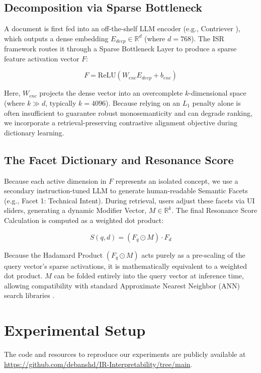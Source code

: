 \documentclass[sigconf,authordraft]{acmart}
\begin{document}
\subsection{Decomposition via Sparse Bottleneck}
A document is first fed into an off-the-shelf LLM encoder (e.g., Contriever \cite{izacard2022}), which outputs a dense embedding $E_{deep} \in \mathbb{R}^d$ (where $d=768$). The ISR framework routes it through a Sparse Bottleneck Layer to produce a sparse feature activation vector $F$:

\begin{equation}
F = \text{ReLU}(W_{enc}E_{deep} + b_{enc})
\end{equation}

Here, $W_{enc}$ projects the dense vector into an overcomplete $k$-dimensional space (where $k \gg d$, typically $k=4096$). Because relying on an $L_1$ penalty alone is often insufficient to guarantee robust monosemanticity and can degrade ranking, we incorporate a retrieval-preserving contrastive alignment objective during dictionary learning.

\subsection{The Facet Dictionary and Resonance Score}
Because each active dimension in $F$ represents an isolated concept, we use a secondary instruction-tuned LLM to generate human-readable Semantic Facets (e.g., Facet 1: Technical Intent). During retrieval, users adjust these facets via UI sliders, generating a dynamic Modifier Vector, $M \in \mathbb{R}^k$. The final Resonance Score Calculation is computed as a weighted dot product:

\begin{equation}
S(q,d) = (F_q \odot M) \cdot F_d
\end{equation}

Because the Hadamard Product $(F_q \odot M)$ acts purely as a pre-scaling of the query vector's sparse activations, it is mathematically equivalent to a weighted dot product. $M$ can be folded entirely into the query vector at inference time, allowing compatibility with standard Approximate Nearest Neighbor (ANN) search libraries \cite{johnson2019}.

\section{Experimental Setup}
The code and resources to reproduce our experiments are publicly available at \url{https://github.com/debanshd/IR-Interpretability/tree/main}.
\end{document}
